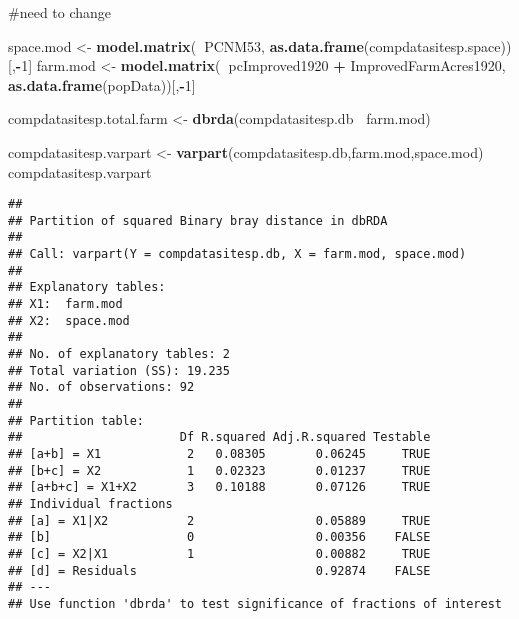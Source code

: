 \documentclass[
]{article}
\newenvironment{Shaded}{\begin{snugshade}}{\end{snugshade}}
\newcommand{\DecValTok}[1]{\textcolor[rgb]{0.00,0.00,0.81}{#1}}
\newcommand{\KeywordTok}[1]{\textcolor[rgb]{0.13,0.29,0.53}{\textbf{#1}}}
\newcommand{\NormalTok}[1]{#1}
\newcommand{\OperatorTok}[1]{\textcolor[rgb]{0.81,0.36,0.00}{\textbf{#1}}}
\newcommand{\StringTok}[1]{\textcolor[rgb]{0.31,0.60,0.02}{#1}}
\begin{document}
\#need to change

\begin{Shaded}
\begin{Highlighting}[]
\NormalTok{space.mod <-}\StringTok{ }\KeywordTok{model.matrix}\NormalTok{(}\OperatorTok{~}\NormalTok{PCNM53, }\KeywordTok{as.data.frame}\NormalTok{(compdatasitesp.space))[,}\OperatorTok{-}\DecValTok{1}\NormalTok{]}
\NormalTok{farm.mod <-}\StringTok{ }\KeywordTok{model.matrix}\NormalTok{(}\OperatorTok{~}\NormalTok{pcImproved1920 }\OperatorTok{+}\StringTok{ }\NormalTok{ImprovedFarmAcres1920, }\KeywordTok{as.data.frame}\NormalTok{(popData))[,}\OperatorTok{-}\DecValTok{1}\NormalTok{]}
\end{Highlighting}
\end{Shaded}

\begin{Shaded}
\begin{Highlighting}[]
\NormalTok{compdatasitesp.total.farm <-}\StringTok{ }\KeywordTok{dbrda}\NormalTok{(compdatasitesp.db }\OperatorTok{~}\NormalTok{farm.mod)}
\end{Highlighting}
\end{Shaded}

\begin{Shaded}
\begin{Highlighting}[]
\NormalTok{compdatasitesp.varpart <-}\StringTok{ }\KeywordTok{varpart}\NormalTok{(compdatasitesp.db,farm.mod,space.mod)}
\NormalTok{compdatasitesp.varpart}
\end{Highlighting}
\end{Shaded}

\begin{verbatim}
## 
## Partition of squared Binary bray distance in dbRDA 
## 
## Call: varpart(Y = compdatasitesp.db, X = farm.mod, space.mod)
## 
## Explanatory tables:
## X1:  farm.mod
## X2:  space.mod 
## 
## No. of explanatory tables: 2 
## Total variation (SS): 19.235 
## No. of observations: 92 
## 
## Partition table:
##                      Df R.squared Adj.R.squared Testable
## [a+b] = X1            2   0.08305       0.06245     TRUE
## [b+c] = X2            1   0.02323       0.01237     TRUE
## [a+b+c] = X1+X2       3   0.10188       0.07126     TRUE
## Individual fractions                                    
## [a] = X1|X2           2                 0.05889     TRUE
## [b]                   0                 0.00356    FALSE
## [c] = X2|X1           1                 0.00882     TRUE
## [d] = Residuals                         0.92874    FALSE
## ---
## Use function 'dbrda' to test significance of fractions of interest
\end{verbatim}
\end{document}
